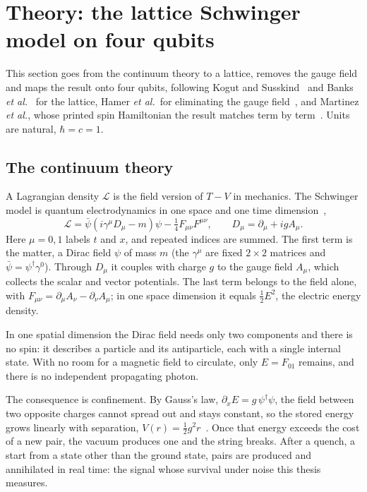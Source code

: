 \section{Theory: the lattice Schwinger model on four qubits}
\label{sec:theory}

This section goes from the continuum theory to a lattice, removes the gauge
field and maps the result onto four qubits, following Kogut and Susskind~\cite{kogut1975} and Banks
\emph{et al.}~\cite{banks1976} for the lattice, Hamer \emph{et al.}\ for
eliminating the gauge field~\cite{hamer1997}, and Martinez \emph{et al.}, whose
printed spin Hamiltonian the result matches term by term~\cite{martinez2016}.
Units are natural, $\hbar = c = 1$.

\subsection{The continuum theory}

A Lagrangian density $\mathcal{L}$ is the field version of $T - V$ in
mechanics. The Schwinger model is quantum electrodynamics in one space and one
time dimension~\cite{schwinger1962},
\begin{equation}
  \label{eq:lagrangian}
  \mathcal{L} = \bar\psi\left(i\gamma^\mu D_\mu - m\right)\psi
              - \tfrac14 F_{\mu\nu}F^{\mu\nu},
  \qquad D_\mu = \partial_\mu + i g A_\mu .
\end{equation}
Here $\mu = 0, 1$ labels $t$ and $x$, and repeated indices are summed. The
first term is the matter, a Dirac field $\psi$ of mass $m$ (the $\gamma^\mu$
are fixed $2\times2$ matrices and $\bar\psi = \psi^\dagger\gamma^0$). Through
$D_\mu$ it couples with charge $g$ to the gauge field $A_\mu$, which collects the
scalar and vector potentials. The last term belongs to the field alone, with
$F_{\mu\nu} = \partial_\mu A_\nu - \partial_\nu A_\mu$; in one space dimension
it equals $\tfrac12 E^2$, the electric energy density.

In one spatial dimension the Dirac field needs only two components and there is
no spin: it describes a particle and its antiparticle, each with a single
internal state. With no room for a magnetic field to circulate, only
$E = F_{01}$ remains, and there is no independent propagating photon.

The consequence is confinement. By Gauss's law, $\partial_x E = g\,\psi^\dagger
\psi$, the field between two opposite charges cannot spread out and
stays constant, so the stored energy grows linearly with separation,
$V(r) = \tfrac12 g^2 r$~\cite{coleman1975}. Once that energy exceeds the cost of
a new pair, the vacuum produces one and the string breaks. After a quench, a
start from a state other than the ground state, pairs are produced and
annihilated in real time: the signal whose survival under noise this thesis
measures.

